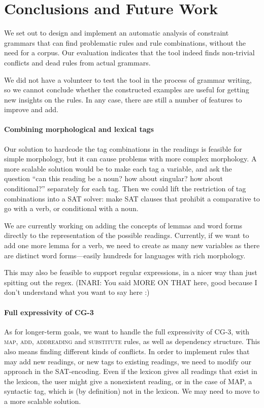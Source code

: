 \section{Conclusions and Future Work}
\label{sec:conclusion}

We set out to design and implement an automatic analysis of constraint grammars that can find problematic rules and rule combinations, without the need for a corpus.
Our evaluation indicates that the tool indeed finds non-trivial conflicts and dead rules
from actual grammars. 

We did not have a volunteer to test the tool in
the process of grammar writing, so we cannot conclude whether the
constructed examples are useful for getting new insights on the rules.
In any case, there are still a number of features to improve and add.

\paragraph{Combining morphological and lexical tags}

Our solution to hardcode the tag combinations in the readings is
feasible for simple morphology, but it can cause problems with more
complex morphology.
A more scalable solution would be to make each tag a variable, and ask the
question ``can this reading be a noun? how about singular? how about
conditional?'' separately for each tag. Then we could lift the
restriction of tag combinations into a SAT solver: make SAT clauses
that prohibit a comparative to go with a verb, or conditional with a noun.

We are currently working on adding the concepts of lemmas and word
forms directly to the representation of the possible readings.
Currently, if we want to add one more lemma for a verb, we need to
create as many new variables as there are distinct word forms---easily
hundreds for languages with rich morphology. 

This may also be feasible to support regular expressions, in a nicer
way than just spitting out the regex. (INARI: You said MORE ON THAT here, good because I don't understand what you want to say here :)

\paragraph{Full expressivity of CG-3}
As for longer-term goals, we want to handle the full expressivity of CG-3,
with \textsc{map}, \textsc{add},  \textsc{addreading} and
\textsc{substitute} rules, as well as dependency structure. 
This also means finding different kinds of conflicts.
In order to implement rules that may add new readings, or new tags to
existing readings, we need to modify our approach in the SAT-encoding.
Even if the lexicon gives all readings that exist in the lexicon, the
user might give a nonexistent reading, or in the case of MAP, a
syntactic tag, which is (by definition) not in the lexicon. We may need to move
to a more scalable solution.


